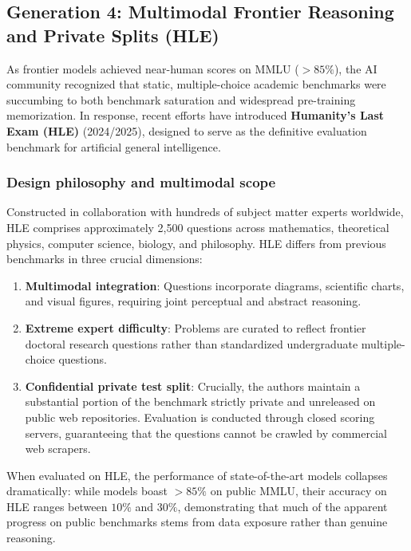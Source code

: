 \documentclass[../../../main.tex]{subfiles}
\begin{document}
\subsection{Generation 4: Multimodal Frontier Reasoning and Private Splits (HLE)}
\label{subsec:hle_benchmark}

As frontier models achieved near-human scores on MMLU ($>85\%$), the AI community recognized that static, multiple-choice academic benchmarks were succumbing to both benchmark saturation and widespread pre-training memorization. In response, recent efforts have introduced \textbf{Humanity's Last Exam (HLE)} (2024/2025), designed to serve as the definitive evaluation benchmark for artificial general intelligence.

\subsubsection{Design philosophy and multimodal scope}
Constructed in collaboration with hundreds of subject matter experts worldwide, HLE comprises approximately 2,500 questions across mathematics, theoretical physics, computer science, biology, and philosophy. HLE differs from previous benchmarks in three crucial dimensions:
\begin{enumerate}
    \item \textbf{Multimodal integration}: Questions incorporate diagrams, scientific charts, and visual figures, requiring joint perceptual and abstract reasoning.
    \item \textbf{Extreme expert difficulty}: Problems are curated to reflect frontier doctoral research questions rather than standardized undergraduate multiple-choice questions.
    \item \textbf{Confidential private test split}: Crucially, the authors maintain a substantial portion of the benchmark strictly private and unreleased on public web repositories. Evaluation is conducted through closed scoring servers, guaranteeing that the questions cannot be crawled by commercial web scrapers.
\end{enumerate}

When evaluated on HLE, the performance of state-of-the-art models collapses dramatically: while models boast $>85\%$ on public MMLU, their accuracy on HLE ranges between $10\%$ and $30\%$, demonstrating that much of the apparent progress on public benchmarks stems from data exposure rather than genuine reasoning.
\end{document}
